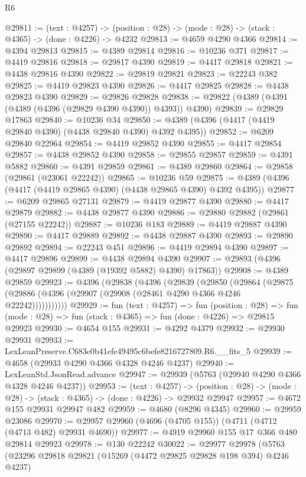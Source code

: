 \begin{lexlean}{R6}
\begin{coremodule}
@29811 := (text : @4257) ->
  (position : @28) -> (mode : @28) -> (stack : @4365) -> (done : @4226) -> @4232
@29813 := @4659 @4290 @4366
@29814 := @4394 @29813
@29815 := @4389 @29814
@29816 := @10236 @371
@29817 := @4419 @29816
@29818 := @29817 @4390
@29819 := @4417 @29818
@29821 := @4438 @29816 @4390
@29822 := @29819 @29821
@29823 := @22243 @382
@29825 := @4419 @29823 @4390
@29826 := @4417 @29825
@29828 := @4438 @29823 @4390
@29829 := @29826 @29828
@29838 := @29822 (@4389 (@4391 (@4389 (@4396 (@29829 @4390 @4390)) @4393)) @4390)
@29839 := @29829 @17863
@29840 := @10236 @34
@29850 := @4389 (@4396 (@4417 (@4419 @29840 @4390) (@4438 @29840 @4390) @4392 @4395))
@29852 := @6209 @29840 @22964
@29854 := @4419 @29852 @4390
@29855 := @4417 @29854
@29857 := @4438 @29852 @4390
@29858 := @29855 @29857
@29859 := @4391 @5882
@29860 := @4391 @29859
@29861 := @4389 @29860
@29864 := @29858 (@29861 (@23061 @22242))
@29865 := @10236 @59
@29875 := @4389 (@4396 (@4417 (@4419 @29865 @4390) (@4438 @29865 @4390) @4392 @4395))
@29877 := @6209 @29865 @27131
@29879 := @4419 @29877 @4390
@29880 := @4417 @29879
@29882 := @4438 @29877 @4390
@29886 := @29880 @29882 (@29861 (@27155 @22242))
@29887 := @10236 @183
@29889 := @4419 @29887 @4390
@29890 := @4417 @29889
@29892 := @4438 @29887 @4390
@29893 := @29890 @29892
@29894 := @22243 @451
@29896 := @4419 @29894 @4390
@29897 := @4417 @29896
@29899 := @4438 @29894 @4390
@29907 := @29893 (@4396 (@29897 @29899 (@4389 (@19392 @5882) @4390) @17863))
@29908 := @4389 @29859
@29923 := @4396
    (@29838
      (@4396
        (@29839
          (@29850
            (@29864
              (@29875 (@29886 (@4396 (@29907 (@29908 (@28461 @4290 @4366 @4246 @22242)))))))))))
@29929 := fun (text : @4257) =>
  fun (position : @28) =>
  fun (mode : @28) => fun (stack : @4365) => fun (done : @4226) => @29815 @29923
@29930 := @4654 @155
@29931 := @4292 @4379
@29932 := @29930 @29931
@29933 := LexLeanPreserve.C683e0b41efe49495c6befe8216727809.R6.__fits_5
@29939 := @4658 (@29933 @4290 @4366 @4328 @4246 @4237)
@29940 := LexLeanStd.JsonRead.advance
@29947 := @29939 (@5763 (@29940 @4290 @4366 @4328 @4246 @4237))
@29953 := (text : @4257) ->
  (position : @28) -> (mode : @28) -> (stack : @4365) -> (done : @4226) -> @29932 @29947
@29957 := @4672 @155 @29931 @29947 @482
@29959 := @4680 (@8296 @4345)
@29960 := @29959 @23086
@29970 := @29957 @29960 (@4696 (@4705 @155)) (@4711 (@4712 (@4713 @482) @29931 @4690))
@29977 := @4919 @29960 @155 @17 @366 @480 @29814 @29923
@29978 := @130 @22242
@30022 := @29977
    @29978
    (@5763
      (@23296
        @29818
        @29821
        (@15269 (@4472 @29825 @29828 @198 @394) @4246 @4237)

\end{coremodule}
\end{lexlean}
